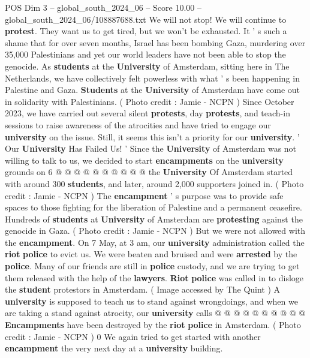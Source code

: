 \begin{textsample}{POS Dim 3 – global\_south\_2024\_06 – Score 10.00 – global\_south\_2024\_06/108887688.txt}  \label{ex:f3_pos_341}
We will not stop!
We will continue to \textbf{protest}.
They want us to get tired, but we won't be exhausted.
It ' s such a shame that for over seven months, Israel has been bombing Gaza, murdering over 35,000 Palestinians and yet our world leaders have not been able to stop the genocide.
As \textbf{students} at the \textbf{University} of Amsterdam, sitting here in The Netherlands, we have collectively felt powerless with what ' s been happening in Palestine and Gaza. \textbf{Students} at the \textbf{University} of Amsterdam have come out in solidarity with Palestinians. ( Photo credit : Jamie - NCPN ) Since October 2023, we have carried out several silent \textbf{protests}, day \textbf{protests}, and teach-in sessions to raise awareness of the atrocities and have tried to engage our \textbf{university} on the issue.
Still, it seems this isn't a priority for our \textbf{university}. ' Our \textbf{University} Has Failed Us! ' Since the \textbf{University} of Amsterdam was not willing to talk to us, we decided to start \textbf{encampments} on the \textbf{university} grounds on 6 @ @ @ @ @ @ @ @ @ @ the \textbf{University} Of Amsterdam started with around 300 \textbf{students}, and later, around 2,000 supporters joined in. ( Photo credit : Jamie - NCPN ) The \textbf{encampment} ' s purpose was to provide safe spaces to those fighting for the liberation of Palestine and a permanent ceasefire.
Hundreds of \textbf{students} at \textbf{University} of Amsterdam are \textbf{protesting} against the genocide in Gaza. ( Photo credit : Jamie - NCPN ) But we were not allowed with the \textbf{encampment}.
On 7 May, at 3 am, our \textbf{university} administration called the \textbf{riot} \textbf{police} to evict us.
We were beaten and bruised and were \textbf{arrested} by the \textbf{police}.
Many of our friends are still in \textbf{police} custody, and we are trying to get them released with the help of the \textbf{lawyers}. \textbf{Riot} \textbf{police} was called in to disloge the \textbf{student} protestors in Amsterdam. ( Image accessed by The Quint ) A \textbf{university} is supposed to teach us to stand against wrongdoings, and when we are taking a stand against atrocity, our \textbf{university} calls @ @ @ @ @ @ @ @ @ @ \textbf{Encampments} have been destroyed by the \textbf{riot} \textbf{police} in Amsterdam. ( Photo credit : Jamie - NCPN ) 0 We again tried to get started with another \textbf{encampment} the very next day at a \textbf{university} building.

\end{textsample}
